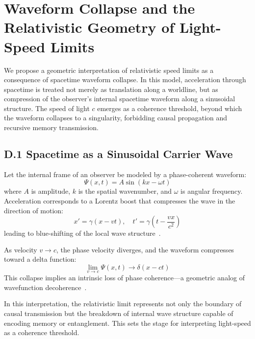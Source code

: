 \appendix
\section{Waveform Collapse and the Relativistic Geometry of Light-Speed Limits}
\label{appendix:D}

We propose a geometric interpretation of relativistic speed limits as a consequence of spacetime waveform collapse. In this model, acceleration through spacetime is treated not merely as translation along a worldline, but as compression of the observer's internal spacetime waveform along a sinusoidal structure. The speed of light \( c \) emerges as a coherence threshold, beyond which the waveform collapses to a singularity, forbidding causal propagation and recursive memory transmission.

\subsection*{D.1 Spacetime as a Sinusoidal Carrier Wave}

Let the internal frame of an observer be modeled by a phase-coherent waveform:
\[
\Psi(x,t) = A \sin(kx - \omega t)
\]
where \( A \) is amplitude, \( k \) is the spatial wavenumber, and \( \omega \) is angular frequency. Acceleration corresponds to a Lorentz boost that compresses the wave in the direction of motion:
\[
x' = \gamma (x - vt), \quad t' = \gamma \left(t - \frac{vx}{c^2}\right)
\]
leading to blue-shifting of the local wave structure~\cite{misner1973gravitation}.

As velocity \( v \to c \), the phase velocity diverges, and the waveform compresses toward a delta function:
\[
\lim_{v \to c} \Psi(x,t) \to \delta(x - ct)
\]
This collapse implies an intrinsic loss of phase coherence—a geometric analog of wavefunction decoherence~\cite{zurek_decoherence_2003}.

In this interpretation, the relativistic limit represents not only the boundary of causal transmission but the breakdown of internal wave structure capable of encoding memory or entanglement. This sets the stage for interpreting light-speed as a coherence threshold.

